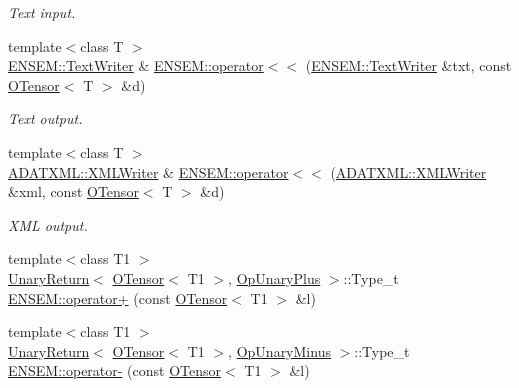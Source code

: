 \begin{DoxyCompactItemize}
\begin{DoxyCompactList}\small\item\em Text input. \end{DoxyCompactList}\item 
{\footnotesize template$<$class T $>$ }\\\mbox{\hyperlink{classENSEM_1_1TextWriter}{E\+N\+S\+E\+M\+::\+Text\+Writer}} \& \mbox{\hyperlink{group__obstensor_ga64bc4e87abaefe7d97e074a4cb88e035}{E\+N\+S\+E\+M\+::operator$<$$<$}} (\mbox{\hyperlink{classENSEM_1_1TextWriter}{E\+N\+S\+E\+M\+::\+Text\+Writer}} \&txt, const \mbox{\hyperlink{classENSEM_1_1OTensor}{O\+Tensor}}$<$ T $>$ \&d)
\begin{DoxyCompactList}\small\item\em Text output. \end{DoxyCompactList}\item 
{\footnotesize template$<$class T $>$ }\\\mbox{\hyperlink{classADATXML_1_1XMLWriter}{A\+D\+A\+T\+X\+M\+L\+::\+X\+M\+L\+Writer}} \& \mbox{\hyperlink{group__obstensor_gaa5233df95541acbbe7762e49152aaeb5}{E\+N\+S\+E\+M\+::operator$<$$<$}} (\mbox{\hyperlink{classADATXML_1_1XMLWriter}{A\+D\+A\+T\+X\+M\+L\+::\+X\+M\+L\+Writer}} \&xml, const \mbox{\hyperlink{classENSEM_1_1OTensor}{O\+Tensor}}$<$ T $>$ \&d)
\begin{DoxyCompactList}\small\item\em X\+ML output. \end{DoxyCompactList}\item 
{\footnotesize template$<$class T1 $>$ }\\\mbox{\hyperlink{structENSEM_1_1UnaryReturn}{Unary\+Return}}$<$ \mbox{\hyperlink{classENSEM_1_1OTensor}{O\+Tensor}}$<$ T1 $>$, \mbox{\hyperlink{structENSEM_1_1OpUnaryPlus}{Op\+Unary\+Plus}} $>$\+::Type\+\_\+t \mbox{\hyperlink{group__obstensor_ga1b7029ac61e62bdd191703e814e622b3}{E\+N\+S\+E\+M\+::operator+}} (const \mbox{\hyperlink{classENSEM_1_1OTensor}{O\+Tensor}}$<$ T1 $>$ \&l)
\item 
{\footnotesize template$<$class T1 $>$ }\\\mbox{\hyperlink{structENSEM_1_1UnaryReturn}{Unary\+Return}}$<$ \mbox{\hyperlink{classENSEM_1_1OTensor}{O\+Tensor}}$<$ T1 $>$, \mbox{\hyperlink{structENSEM_1_1OpUnaryMinus}{Op\+Unary\+Minus}} $>$\+::Type\+\_\+t \mbox{\hyperlink{group__obstensor_gab017a217eb9e1e85386eb640bca457ab}{E\+N\+S\+E\+M\+::operator-\/}} (const \mbox{\hyperlink{classENSEM_1_1OTensor}{O\+Tensor}}$<$ T1 $>$ \&l)
\item 

\end{DoxyCompactItemize}

